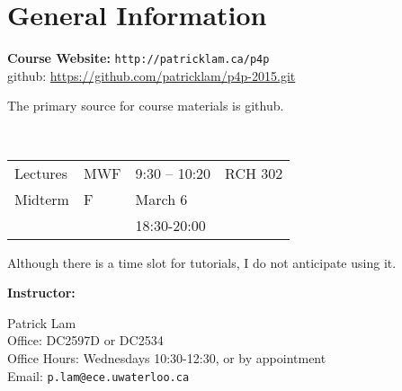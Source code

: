 \documentclass{article}
\begin{document}
\section*{General Information}

\noindent
\begin{tabbing}
    {\bf Course Website:} \={\tt http://patricklam.ca/p4p}\\[0.5em]
    github: \> \url{https://github.com/patricklam/p4p-2015.git}
\end{tabbing}
The primary source for course materials is github.

\\

\noindent
\hspace*{2em} \begin{tabular}{llll}
  Lectures & MWF & 9:30 -- 10:20 & RCH 302\\
  Midterm & F & March 6  \\
  & & 18:30-20:00
\end{tabular}

\noindent
Although there is a time slot for tutorials, I do not anticipate using it.

\newpage

\noindent
{\bf Instructor:} \\

\noindent
\hspace*{2em} \begin{minipage}{.6\textwidth}
Patrick Lam\\
Office: DC2597D or DC2534 \\
Office Hours: Wednesdays 10:30-12:30, or by appointment\\
Email: {\tt p.lam@ece.uwaterloo.ca}\\

\end{minipage} \\[1em]

 \\
\end{document}
